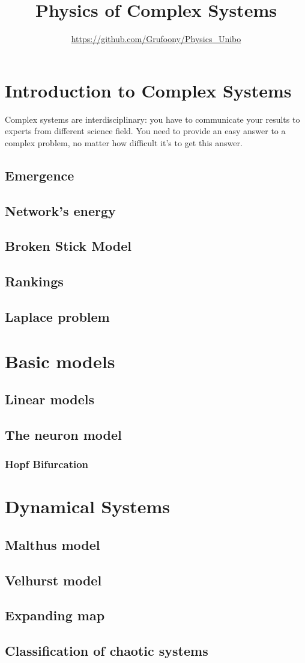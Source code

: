 \documentclass[12pt]{book}
\title{Physics of Complex Systems} \author{\url{https://github.com/Grufoony/Physics_Unibo}}
\date{}
\begin{document}
\maketitle
\tableofcontents
\pagebreak

\chapter{Introduction to Complex Systems}
Complex systems are interdisciplinary: you have to communicate your results to experts from different science field.
You need to provide an easy answer to a complex problem, no matter how difficult it's to get this answer.
\section{Emergence}

\section{Network's energy}

\section{Broken Stick Model}

\section{Rankings}

\section{Laplace problem}

\chapter{Basic models}
\section{Linear models}

\section{The neuron model}

\subsection{Hopf Bifurcation}

\chapter{Dynamical Systems}

\section{Malthus model}

\section{Velhurst model}

\section{Expanding map}

\section{Classification of chaotic systems}

\end{document}
